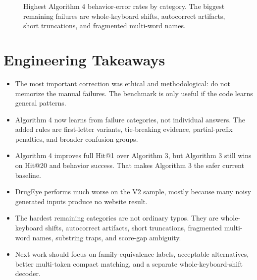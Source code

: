 \documentclass[11pt]{article}
\begin{document}
\begin{figure}[H]
\centering
{}
\caption{Highest Algorithm 4 behavior-error rates by category. The biggest
remaining failures are whole-keyboard shifts, autocorrect artifacts, short
truncations, and fragmented multi-word names.}
\end{figure}

\section{Engineering Takeaways}

\begin{itemize}
  \item The most important correction was ethical and methodological: do not
        memorize the manual failures. The benchmark is only useful if the code
        learns general patterns.
  \item Algorithm 4 now learns from failure categories, not individual answers.
        The added rules are first-letter variants, tie-breaking evidence,
        partial-prefix penalties, and broader confusion groups.
  \item Algorithm 4 improves full Hit@1 over Algorithm 3, but Algorithm 3 still
        wins on Hit@20 and behavior success. That makes Algorithm 3 the safer
        current baseline.
  \item DrugEye performs much worse on the V2 sample, mostly because many noisy
        generated inputs produce no website result.
  \item The hardest remaining categories are not ordinary typos. They are
        whole-keyboard shifts, autocorrect artifacts, short truncations,
        fragmented multi-word names, substring traps, and score-gap ambiguity.
  \item Next work should focus on family-equivalence labels, acceptable
        alternatives, better multi-token compact matching, and a separate
        whole-keyboard-shift decoder.
\end{itemize}
\end{document}

